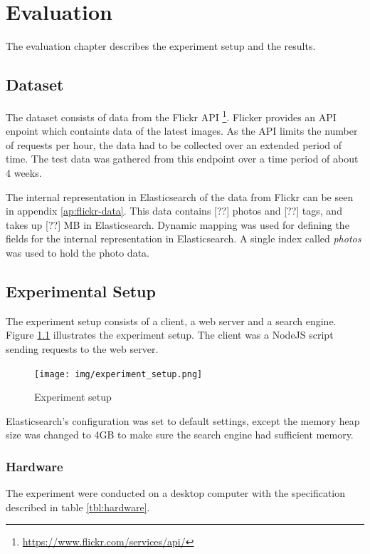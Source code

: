 \chapter{Evaluation}
\label{ch:evaluation}
The evaluation chapter describes the experiment setup and the results.

\section{Dataset}
The dataset consists of data from the Flickr API \footnote{\url{https://www.flickr.com/services/api/}}.
Flicker provides an API enpoint which containts data of the latest images.
As the API limits the number of requests per hour, the data had to be collected over an extended period of time.
The test data was gathered from this endpoint over a time period of about 4 weeks.

The internal representation in Elasticsearch of the data from Flickr can be seen in appendix \ref{ap:flickr-data}.
This data contains [??] photos and [??] tags, and takes up [??] MB in Elasticsearch.
Dynamic mapping was used for defining the fields for the internal representation in Elasticsearch.
A single index called \textit{photos} was used to hold the photo data.

\section{Experimental Setup}

The experiment setup consists of a client, a web server and a search engine.
Figure \ref{fig:experiment-setup} illustrates the experiment setup.
The client was a NodeJS script sending requests to the web server.

\begin{figure}[h!]
  \centering \texttt{[image: img/experiment\_setup.png]}
  \caption{Experiment setup}
  \label{fig:experiment-setup}
\end{figure}

Elasticsearch's configuration was set to default settings,
except the memory heap size was changed to 4GB to make sure the search engine had sufficient memory.

\subsection{Hardware}
The experiment were conducted on a desktop computer with the specification described in table \ref{tbl:hardware}.

